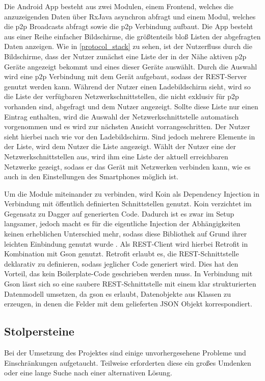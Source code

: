 		Die Android App besteht aus zwei Modulen, einem Frontend, welches die anzuzeigenden Daten über RxJava asynchron abfragt und einem Modul, welches die p2p Broadcasts abfragt sowie die p2p Verbindung aufbaut.
		Die App besteht aus einer Reihe einfacher Bildschirme, die größtenteils bloß Listen der abgefragten Daten anzeigen. Wie in \figurename \ref{protocol_stack} zu sehen, ist der Nutzerfluss durch die Bildschirme, dass der Nutzer zunächst eine Liste der in der Nähe aktiven p2p Geräte angezeigt bekommt und eines dieser Geräte auswählt. Durch die Auswahl wird eine p2p Verbindung mit dem Gerät aufgebaut, sodass der REST-Server genutzt werden kann. Während der Nutzer einen Ladebildschirm sieht, wird so die Liste der verfügbaren Netzwerkschnittstellen, die nicht exklusiv für p2p vorhanden sind, abgefragt und dem Nutzer angezeigt. Sollte diese Liste nur einen Eintrag enthalten, wird die Auswahl der Netzwerkschnittstelle automatisch vorgenommen und es wird zur nächsten Ansicht vorrangeschritten. Der Nutzer sieht hierbei nach wie vor den Ladebildschirm. Sind jedoch mehrere Elemente in der Liste, wird dem Nutzer die Liste angezeigt. Wählt der Nutzer eine der Netzwerkschnittstellen aus, wird ihm eine Liste der aktuell erreichbaren Netzwerke gezeigt, sodass er das Gerät mit Netzwerken verbinden kann, wie es auch in den Einstellungen des Smartphones möglich ist.
		
		Um die Module miteinander zu verbinden, wird Koin \cite{androidKoin} als Dependency Injection in Verbindung mit öffentlich definierten Schnittstellen genutzt. Koin verzichtet im Gegensatz zu Dagger auf generierten Code. Dadurch ist es zwar im Setup langsamer, jedoch macht es für die eigentliche Injection der Abhängigkeiten keinen erheblichen Unterschied mehr, sodass diese Bibliothek auf Grund ihrer leichten Einbindung genutzt wurde \cite{androidKoinSpeed}. Als REST-Client wird hierbei Retrofit in Kombination mit Gson genutzt. Retrofit erlaubt es, die REST-Schnittstelle deklarativ zu definieren, sodass jeglicher Code generiert wird. Dies hat den Vorteil, das kein Boilerplate-Code geschrieben werden muss. In Verbindung mit Gson lässt sich so eine saubere REST-Schnittstelle mit einem klar strukturierten Datenmodell umsetzen, da gson es erlaubt, Datenobjekte aus Klassen zu erzeugen, in denen die Felder mit dem gelieferten JSON Objekt korrespondiert.

	\subsection{Stolpersteine}
		Bei der Umsetzung des Projektes sind einige unvorhergesehene Probleme und Einschränkungen aufgetaucht. Teilweise erforderten diese ein großes Umdenken oder eine lange Suche nach einer alternativen Lösung.
		
